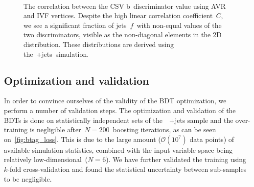 \begin{figure}
\begin{centering}
 \\
\caption[The correlation between the CSV b~discriminator value using AVR and IVF vertices]{The correlation between the CSV b~discriminator value using AVR and IVF vertices. Despite the high linear correlation coefficient~$C$, we see a significant fraction of jets~$f$~with non-equal values of the two discriminators, visible as the non-diagonal elements in the 2D distribution. These distributions are derived using the~\ttbar+jets~simulation.}
\label{fig:btag_csv_correlation}
\end{centering}
\end{figure}

\subsection{Optimization and validation}
In order to convince ourselves of the validity of the BDT optimization, we perform a number of validation steps. The optimization and validation of the BDTs is done on statistically independent sets of the~\ttbar~+jets sample and the over-training is negligible after~$N=200$~boosting iterations, as can be seen on~\cref{fig:btag_loss}. This is due to the large amount ($\mathcal{O}(10^7)$ data points) of available simulation statistics, combined with the input variable space being relatively low-dimensional~($N=6$). We have further validated the training using $k$-fold cross-validation and found the statistical uncertainty between sub-samples to be negligible.

